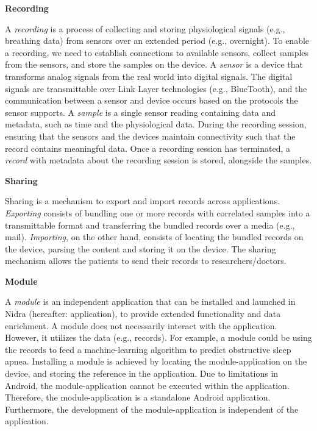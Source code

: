 
\noindent\textbf{Recording}

\noindent A \textit{recording} is a process of collecting and storing physiological signals (e.g., breathing data) from sensors over an extended period (e.g., overnight). To enable a recording, we need to establish connections to available sensors, collect samples from the sensors, and store the samples on the device. A \textit{sensor} is a device that transforms analog signals from the real world into digital signals. The digital signals are transmittable over Link Layer technologies (e.g., BlueTooth), and the communication between a sensor and device occurs based on the protocols the sensor supports. A \textit{sample} is a single sensor reading containing data and metadata, such as time and the physiological data. During the recording session, ensuring that the sensors and the devices maintain connectivity such that the record contains meaningful data.  Once a recording session has terminated, a \textit{record} with metadata about the recording session is stored, alongside the samples.    

\noindent \textbf{Sharing}

\noindent Sharing is a mechanism to export and import records across applications. \textit{Exporting} consists of bundling one or more records with correlated samples into a transmittable format and transferring the bundled records over a media (e.g., mail). \textit{Importing}, on the other hand, consists of locating the bundled records on the device, parsing the content and storing it on the device. The sharing mechanism allows the patients to send their records to researchers/doctors.

\noindent \textbf{Module}

\noindent A \textit{module} is an independent application that can be installed and launched in Nidra (hereafter: application), to provide extended functionality and data enrichment. A module does not necessarily interact with the application. However, it utilizes the data (e.g., records). For example, a module could be using the records to feed a machine-learning algorithm to predict obstructive sleep apnea. Installing a module is achieved by locating the module-application on the device, and storing the reference in the application. Due to limitations in Android, the module-application cannot be executed within the application. Therefore, the module-application is a standalone Android application. Furthermore, the development of the module-application is independent of the application. 

